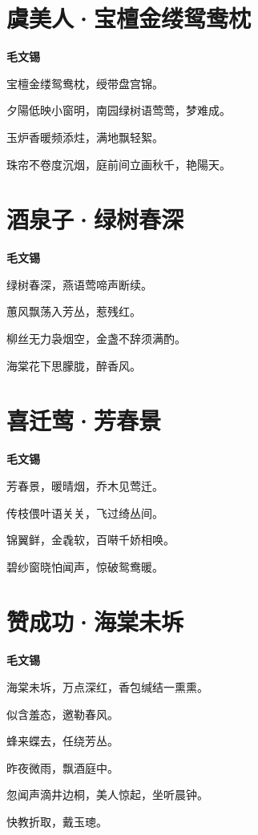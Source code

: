 \documentclass[12pt,a4paper]{ctexbook}
\begin{document}
\section{虞美人·宝檀金缕鸳鸯枕}
\textbf{毛文锡}\par\vspace{0.5em}
宝檀金缕鸳鸯枕，绶带盘宫锦。\par
夕陽低映小窗明，南园绿树语莺莺，梦难成。\par
玉炉香暖频添炷，满地飘轻絮。\par
珠帘不卷度沉烟，庭前间立画秋千，艳陽天。\par

\section{酒泉子·绿树春深}
\textbf{毛文锡}\par\vspace{0.5em}
绿树春深，燕语莺啼声断续。\par
蕙风飘荡入芳丛，惹残红。\par
柳丝无力袅烟空，金盏不辞须满酌。\par
海棠花下思朦胧，醉香风。\par

\section{喜迁莺·芳春景}
\textbf{毛文锡}\par\vspace{0.5em}
芳春景，暖晴烟，乔木见莺迁。\par
传枝偎叶语关关，飞过绮丛间。\par
锦翼鲜，金毳软，百啭千娇相唤。\par
碧纱窗晓怕闻声，惊破鸳鸯暖。\par

\section{赞成功·海棠未坼}
\textbf{毛文锡}\par\vspace{0.5em}
海棠未坼，万点深红，香包缄结一熏熏。\par
似含羞态，邀勒春风。\par
蜂来蝶去，任绕芳丛。\par
昨夜微雨，飘酒庭中。\par
忽闻声滴井边桐，美人惊起，坐听晨钟。\par
快教折取，戴玉璁。\par
\end{document}
